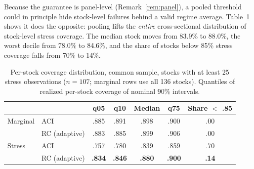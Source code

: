 Because the guarantee is panel-level (Remark~\ref{rem:panel}), a pooled
threshold could in principle hide stock-level failures behind a valid
regime average. Table~\ref{tab:perstock} shows it does the opposite:
pooling lifts the \emph{entire} cross-sectional distribution of
stock-level stress coverage. The median stock moves from 83.9\% to
88.0\%, the worst decile from 78.0\% to 84.6\%, and the share of stocks
below 85\% stress coverage falls from 70\% to 14\%.

\begin{table}[t]
\centering
\caption{Per-stock coverage distribution, common sample, stocks
with at least 25 stress observations ($n = 107$; marginal rows use all
136 stocks). Quantiles of realized per-stock coverage of nominal 90\%
intervals.}
\label{tab:perstock}
\small
\begin{tabular}{llccccc}
\toprule
 & & q05 & q10 & Median & q75 & Share $<$ .85 \\
\midrule
Marginal & ACI & .885 & .891 & .898 & .900 & .00 \\
 & RC (adaptive) & .883 & .885 & .899 & .906 & .00 \\
\addlinespace
Stress & ACI & .757 & .780 & .839 & .859 & .70 \\
 & RC (adaptive) & \textbf{.834} & \textbf{.846} & \textbf{.880} & \textbf{.900} & \textbf{.14} \\
\bottomrule
\end{tabular}
\end{table}

